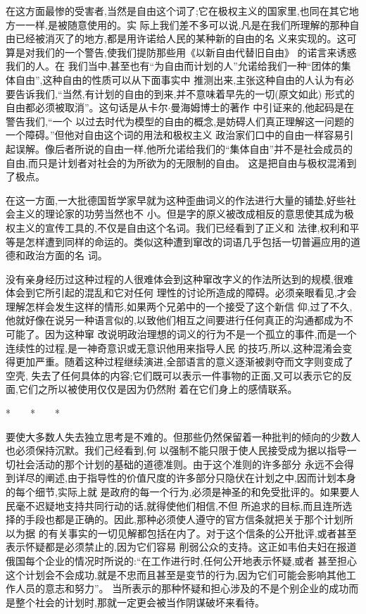 ﻿\documentclass[12pt]{article}
\begin{document}
在这方面最惨的受害者,当然是自由这个词了;它在极权主义的国家里,也同在其它地方一一样,是被随意使用的。实
际上我们差不多可以说,凡是在我们所理解的那种自由已经被消灭了的地方,都是用许诺给人民的某种新的自由的名
义来实现的。这可算是对我们的一个警告,使我们提防那些用《以新自由代替旧自由》 的诺言来诱惑我们的人。在
我们当中,甚至也有``为自由而计划的人''允诺给我们一种``团体的集体自由'',这种自由的性质可以从下面事实中
推测出来,主张这种自由的人认为有必要告诉我们,``当然,有计划的自由的到来,并不意味着早先的一切(原文如此)
形式的自由都必须被取消''。这句话是从卡尔$\cdot$曼海姆博士的著作 中引证来的,他起码是在警告我们,``一个
以过去时代为模型的自由的概念,是妨碍人们真正理解这一问题的一个障碍。''但他对自由这个词的用法和极权主义
政治家们口中的自由一样容易引起误解。像后者所说的自由一样,他所允诺给我们的``集体自由''并不是社会成员的
自由,而只是计划者对社会的为所欲为的无限制的自由。 这是把自由与极权混淆到了极点。

在这一方面,一大批德国哲学家早就为这种歪曲词义的作法进行大量的铺垫,好些社会主义的理论家的功劳当然也不
小。但是字的原义被改成相反的意思使其成为极权主义的宣传工具的,不仅是自由这个名词。我们已经看到了正义和
法律,权利和平等是怎样遭到同样的命运的。类似这种遭到窜改的词语几乎包括一切普遍应用的道德和政治方面的名
词。

没有亲身经历过这种过程的人很难体会到这种窜改字义的作法所达到的规模,很难体会到它所引起的混乱和它对任何
理性的讨论所造成的障碍。必须亲眼看见,才会理解怎样会发生这样的情形,如果两个兄弟中的一个接受了这个新信
仰,过了不久,他就好像在说另一种语言似的,以致他们相互之间要进行任何真正的沟通都成为不可能了。因为这种窜
改说明政治理想的词义的行为不是一个孤立的事件,而是一个连续性的过程,是一神奇意识或无意识他用来指导人民
的技巧,所以,这种混淆会变得更加严重。随着这种过程继续演进,全部语言的意义逐渐被剥夺而文字则变成了空壳,
失去了任何具体的内容;它们既可以表示一件事物的正面,又可以表示它的反面,它们之所以被使用仅仅是因为仍然附
着在它们身上的感情联系。

*　　*　　*

要使大多数人失去独立思考是不难的。但那些仍然保留着一种批判的倾向的少数人也必须保持沉默。我们己经看到,何
以强制不能只限于使人民接受成为据以指导一切社会活动的那个计划的基础的道德准则。由于这个准则的许多部分
永远不会得到详尽的阐述,由于指导性的价值尺度的许多部分只隐伏在计划之中,因而计划本身的每个细节,实际上就
是政府的每一个行为,必须是神圣的和免受批评的。如果要人民毫不迟疑地支持共同行动的话,就得使他们相信,不但
所追求的目标,而且连所选择的手段也都是正确的。因此,那种必须使人遵守的官方信条就把关于那个计划所以为据
的有关事实的一切见解都包括在内了。对于这个信条的公开批评,或者甚至表示怀疑都是必须禁止的,因为它们容易
削弱公众的支持。这正如韦伯夫妇在报道俄国每个企业的情况时所说的:``在工作进行时,任何公开地表示怀疑,或者
甚至担心这个计划会不会成功,就是不忠而且甚至是变节的行为,因为它们可能会影响其他工作人员的意志和努力''。
当所表示的那种怀疑和担心涉及的不是个别企业的成功而是整个社会的计划时,那就一定更会被当作阴谋破坏来看待。
\end{document}
